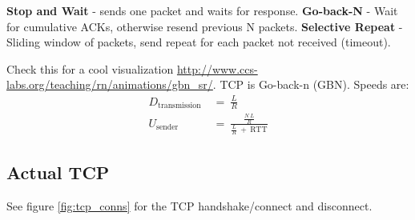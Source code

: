 \documentclass{article}
\begin{document}
\vskip 0.1in
\textbf{Stop and Wait} - sends one packet and waits for response.
\vskip 0.03in\textbf{Go-back-N} - Wait for cumulative ACKs, otherwise resend previous N packets.
\vskip 0.03in
\textbf{Selective Repeat} - Sliding window of packets, send repeat for each packet not received (timeout).

Check this for a cool visualization \url{http://www.ccs-labs.org/teaching/rn/animations/gbn_sr/}.
TCP is Go-back-n (GBN). Speeds are:
\begin{align}
    D_{\text{transmission}}\ &=\ \frac{L}{R} \\
    U_{\text{sender}}\ &=\ \frac{\frac{N\ L}{R}}{\frac{L}{R}\ +\ \text{RTT}}
\end{align}

\subsection{Actual TCP}
See figure \ref{fig:tcp_conns} for the TCP handshake/connect and disconnect.
\end{document}
